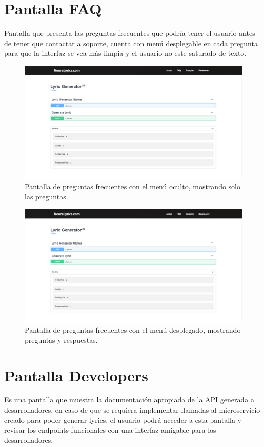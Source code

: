 \documentclass[12pt, a4paper, titlepage]{article}
\begin{document}
		\section{Pantalla FAQ}
		Pantalla que presenta las preguntas frecuentes que podría tener el usuario antes de tener que contactar a soporte, cuenta con menú desplegable en cada pregunta para que la interfaz se vea más limpia y el usuario no este saturado de texto.
		
		\begin{figure}[H] 
			\includegraphics[width=13.5cm]{./Imagenes/Capturas/pdev.png}
			\centering \caption{Pantalla de preguntas frecuentes con el menú oculto, mostrando solo las preguntas.}
		\end{figure}
	
		\begin{figure}[H] 
		\includegraphics[width=13.5cm]{./Imagenes/Capturas/pdev.png}
		\centering \caption{Pantalla de preguntas frecuentes con el menú desplegado, mostrando preguntas y respuestas.}
		\end{figure}
	
		\section{Pantalla Developers}
		Es una pantalla que muestra la documentación apropiada de la API generada a desarrolladores, en caso de que se requiera implementar llamadas al microservicio creado para poder generar lyrics, el usuario podrá acceder a esta pantalla y revisar los endpoints funcionales con una interfaz amigable para los desarrolladores.
		
\end{document}
